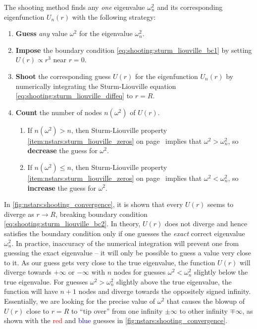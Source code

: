 The shooting method finds any \emph{one} eigenvalue $\omega_n^2$ and its corresponding eigenfunction $U_n(r)$ with the following strategy:
\begin{enumerate}
\item \textbf{Guess} \emph{any} value $\omega^2$ for the eigenvalue $\omega_n^2$.
\item \textbf{Impose} the boundary condition \eqref{eq:shooting:sturm_liouville_bc1} by setting $U(r) \propto r^3$ near $r = 0$. \label{item:shooting:bc1}
\item \textbf{Shoot} the corresponding guess $U(r)$ for the eigenfunction $U_n(r)$ by numerically integrating the Sturm-Liouville equation \eqref{eq:shooting:sturm_liouville_diffeq} to $r=R$. \label{item:shooting:shoot}
\item \textbf{Count} the number of nodes $n(\omega^2)$ of $U(r)$.  
      \begin{enumerate}
      \item If $n(\omega^2) > n$, then Sturm-Liouville property \ref{item:nstars:sturm_liouville_zeros} on page~\pageref{item:nstars:sturm_liouville_zeros} implies that $\omega^2 > \omega_n^2$, so \textbf{decrease} the guess for $\omega^2$.
      \item If $n(\omega^2) \leq n$, then Sturm-Liouville property \ref{item:nstars:sturm_liouville_zeros} on page~\pageref{item:nstars:sturm_liouville_zeros} implies that $\omega^2 < \omega_n^2$, so \textbf{increase} the guess for $\omega^2$.
      \end{enumerate}
      \label{item:shooting:count}
\end{enumerate}
In \cref{fig:nstars:shooting_convergence}, it is shown that every $U(r)$ seems to diverge as $r \rightarrow R$, breaking boundary condition \eqref{eq:shooting:sturm_liouville_bc2}.
In theory, $U(r)$ does not diverge and hence satisfies the boundary condition only if one guesses the \emph{exact} correct eigenvalue $\omega_n^2$.
In practice, inaccuracy of the numerical integration will prevent one from guessing the exact eigenvalue -- it will only be possible to guess a value very close to it.
As our guess gets very close to the true eigenvalue, the function $U(r)$ will diverge towards $+\infty$ or $-\infty$ with $n$ nodes for guesses $\omega^2 < \omega_n^2$ slightly below the true eigenvalue.
For guesses $\omega^2 > \omega_n^2$ slightly above the true eigenvalue, the function will have $n+1$ nodes and diverge towards the oppositely signed infinity.
Essentially, we are looking for the precise value of $\omega^2$ that causes the blowup of $U(r)$ close to $r=R$ to ``tip over'' from one infinity $\pm \infty$ to other infinity $\mp \infty$, as shown with the \textcolor{red}{red} and \textcolor{blue}{blue} guesses in \cref{fig:nstars:shooting_convergence}.

